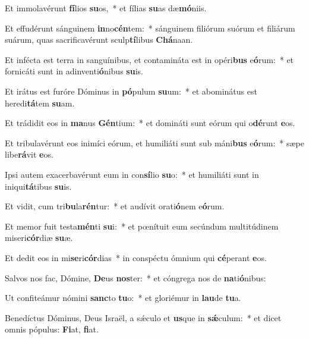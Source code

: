 \item Et immolavérunt \textbf{fí}lios \textbf{su}os,~* et fílias \textbf{su}as dæ\textbf{mó}niis.
\item Et effudérunt sánguinem \textbf{in}no\textbf{cén}tem:~* sánguinem filiórum suórum et filiárum suárum, quas sacrificavérunt sculp\textbf{tí}libus \textbf{Chá}naan.
\item Et infécta est terra in sanguínibus, et contamináta est in opéri\textbf{bus} e\textbf{ó}rum:~* et fornicáti sunt in adinventi\textbf{ó}nibus \textbf{su}is.
\item Et irátus est furóre Dóminus in \textbf{pó}pulum \textbf{su}um:~* et abominátus est heredi\textbf{tá}tem \textbf{su}am.
\item Et trádidit eos in \textbf{ma}nus \textbf{Gén}tium:~* et domináti sunt eórum qui o\textbf{dé}runt \textbf{e}os.
\item Et tribulavérunt eos inimíci eórum, et humiliáti sunt sub máni\textbf{bus} e\textbf{ó}rum:~* sæpe libe\textbf{rá}vit \textbf{e}os.
\item Ipsi autem exacerbavérunt eum in con\textbf{sí}lio \textbf{su}o:~* et humiliáti sunt in iniqui\textbf{tá}tibus \textbf{su}is.
\item Et vidit, cum tri\textbf{bu}la\textbf{rén}tur:~* et audívit orati\textbf{ó}nem e\textbf{ó}rum.
\item Et memor fuit testa\textbf{mén}ti \textbf{su}i:~* et pœnítuit eum secúndum multitúdinem miseri\textbf{cór}diæ \textbf{su}æ.
\item Et dedit eos in mi\textbf{se}ri\textbf{cór}dias~* in conspéctu ómnium qui \textbf{cé}perant \textbf{e}os.
\item Salvos nos fac, Dómine, \textbf{De}us \textbf{nos}ter:~* et cóngrega nos de \textbf{na}ti\textbf{ó}nibus:
\item Ut confiteámur nómini \textbf{sanc}to \textbf{tu}o:~* et gloriémur in \textbf{lau}de \textbf{tu}a.
\item Benedíctus Dóminus, Deus Israël, a sǽculo et \textbf{us}que in \textbf{sǽ}culum:~* et dicet omnis pópulus: \textbf{Fi}at, \textbf{fi}at.
